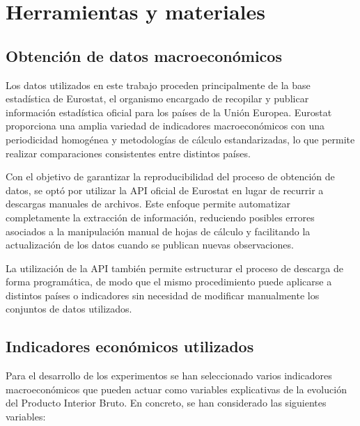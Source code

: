 
\chapter{Herramientas y materiales}
\label{herramientas}

\section{Obtención de datos macroeconómicos}

Los datos utilizados en este trabajo proceden principalmente de la base estadística de Eurostat, el organismo encargado de recopilar y publicar información estadística oficial para los países de la Unión Europea. Eurostat proporciona una amplia variedad de indicadores macroeconómicos con una periodicidad homogénea y metodologías de cálculo estandarizadas, lo que permite realizar comparaciones consistentes entre distintos países.

Con el objetivo de garantizar la reproducibilidad del proceso de obtención de datos, se optó por utilizar la API oficial de Eurostat en lugar de recurrir a descargas manuales de archivos. Este enfoque permite automatizar completamente la extracción de información, reduciendo posibles errores asociados a la manipulación manual de hojas de cálculo y facilitando la actualización de los datos cuando se publican nuevas observaciones.

La utilización de la API también permite estructurar el proceso de descarga de forma programática, de modo que el mismo procedimiento puede aplicarse a distintos países o indicadores sin necesidad de modificar manualmente los conjuntos de datos utilizados.

\section{Indicadores económicos utilizados}

Para el desarrollo de los experimentos se han seleccionado varios indicadores macroeconómicos que pueden actuar como variables explicativas de la evolución del Producto Interior Bruto. En concreto, se han considerado las siguientes variables:

